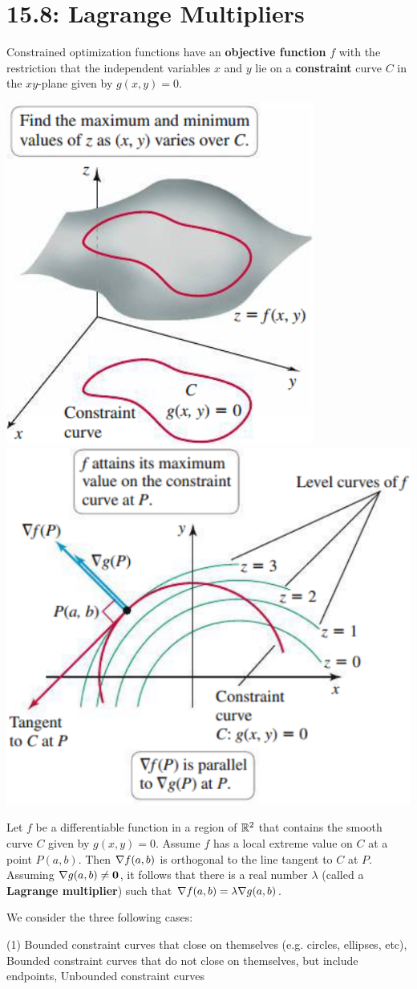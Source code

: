 \documentclass[mathNotesPreamble]{subfiles}
\begin{document}
\section{15.8: Lagrange Multipliers}
  Constrained optimization functions have an \textbf{objective function} $f$ with the restriction that the independent variables $x$ and $y$ lie on a \textbf{constraint} curve $C$ in the $xy$-plane given by $g(x,y)=0$.

  \begin{center}
    \includegraphics[width=0.3\linewidth]{images/briggs_15_08/fig15_79}
    \hspace*{20mm}
    \includegraphics[width=0.375\linewidth]{images/briggs_15_08/fig15_80}
  \end{center}

  \begin{defn*}
    Let $f$ be a differentiable function in a region of $\mathbb{R}^2$ that contains the smooth curve $C$ given by $g(x,y)=0$. Assume $f$ has a local extreme value on $C$ at a point $P(a,b)$. Then $\nabla f(a,b)$ is orthogonal to the line tangent to $C$ at $P$. Assuming $\nabla g(a,b)\neq \mathbf{0}$, it follows that there is a real number $\lambda$ (called a \textbf{Lagrange multiplier}) such that $\nabla f(a,b)=\lambda \nabla g(a,b)$.
  \end{defn*}

  We consider the three following cases:
  \begin{tasks}[label=\textbullet](1)
    \task 
      Bounded constraint curves that close on themselves (e.g. circles, ellipses, etc),
    \task 
      Bounded constraint curves that do not close on themselves, but include endpoints,
    \task 
      Unbounded constraint curves
  \end{tasks}
  \pagebreak
\end{document}
